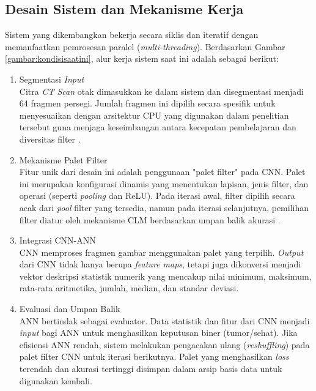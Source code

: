\subsection{Desain Sistem dan Mekanisme Kerja}
Sistem yang dikembangkan bekerja secara siklis dan iteratif dengan memanfaatkan pemrosesan paralel (\textit{multi-threading}). Berdasarkan Gambar \ref{gambar:kondisisaatini}, alur kerja sistem saat ini adalah sebagai berikut:
\begin{enumerate}
	\item Segmentasi \textit{Input}\\
	Citra \textit{CT Scan} otak dimasukkan ke dalam sistem dan disegmentasi menjadi 64 fragmen persegi. Jumlah fragmen ini dipilih secara spesifik untuk menyesuaikan dengan arsitektur CPU yang digunakan dalam penelitian tersebut guna menjaga keseimbangan antara kecepatan pembelajaran dan diversitas filter \cite{wozniak2021deep}.
	
	\item Mekanisme Palet Filter\\
	Fitur unik dari desain ini adalah penggunaan "palet filter" pada CNN. Palet ini merupakan konfigurasi dinamis yang menentukan lapisan, jenis filter, dan operasi (seperti \textit{pooling} dan ReLU). Pada iterasi awal, filter dipilih secara acak dari \textit{pool} filter yang tersedia, namun pada iterasi selanjutnya, pemilihan filter diatur oleh mekanisme CLM berdasarkan umpan balik akurasi \cite{wozniak2021deep}.
	
	\item Integrasi CNN-ANN\\
	CNN memproses fragmen gambar menggunakan palet yang terpilih. \textit{Output} dari CNN tidak hanya berupa \textit{feature maps}, tetapi juga dikonversi menjadi vektor deskripsi statistik numerik yang mencakup nilai minimum, maksimum, rata-rata aritmetika, jumlah, median, dan standar deviasi.
	
	\item Evaluasi dan Umpan Balik\\
	ANN bertindak sebagai evaluator. Data statistik dan fitur dari CNN menjadi \textit{input} bagi ANN untuk menghasilkan keputusan biner (tumor/sehat). Jika efisiensi ANN rendah, sistem melakukan pengacakan ulang (\textit{reshuffling}) pada palet filter CNN untuk iterasi berikutnya. Palet yang menghasilkan \textit{loss} terendah dan akurasi tertinggi disimpan dalam arsip basis data untuk digunakan kembali.
\end{enumerate}

